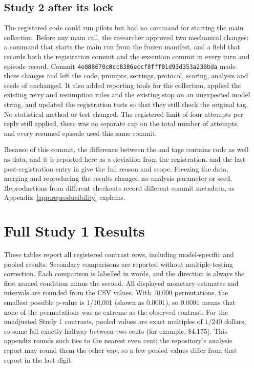 \subsection{Study 2 after its lock}
\label{subapp:study-2-after-its-lock}
The registered code could run pilots but had no command for starting the main collection. Before any main call, the researcher approved two mechanical changes: a command that starts the main run from the frozen manifest, and a field that records both the registration commit and the execution commit in every turn and episode record. Commit \lstinline!4e088670c0cc8386eccf8fff01d93d353a230bda! made these changes and left the code, prompts, settings, protocol, scoring, analysis and seeds of  unchanged. It also added reporting tools for the collection, applied the existing retry and resumption rules and the existing stop on an unexpected model string, and updated the registration tests so that they still check the original tag. No statistical method or test changed. The registered limit of four attempts per reply still applied, there was no separate cap on the total number of attempts, and every resumed episode used this same commit.

Because of this commit, the difference between the  and  tags contains code as well as data, and it is reported here as a deviation from the registration.  and the last post-registration entry in  give the full reason and scope. Freezing the data, merging and reproducing the results changed no analysis parameter or seed. Reproductions from different checkouts record different commit metadata, as Appendix~\ref{app:reproducibility} explains.

\section{Full Study 1 Results}
\label{app:study1-results}
These tables report all registered contrast rows, including model-specific and pooled results. Secondary comparisons are reported without multiple-testing correction. Each comparison is labelled in words, and the direction is always the first named condition minus the second. All displayed monetary estimates and intervals are rounded from the CSV values. With 10,000 permutations, the smallest possible p-value is 1/10,001 (shown as 0.0001), so 0.0001 means that none of the permutations was as extreme as the observed contrast. For the unadjusted Study 1 contrasts, pooled values are exact multiples of $1/240$ dollars, so some fall exactly halfway between two cents (for example, \$4.175). This appendix rounds such ties to the nearest even cent; the repository's analysis report may round them the other way, so a few pooled values differ from that report in the last digit.

